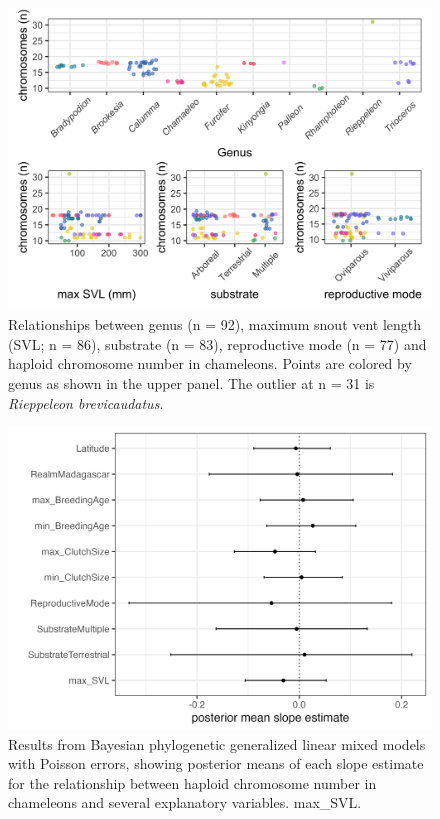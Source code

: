 \documentclass[a4paper, 12pt]{article}
\begin{document}
\begin{figure}[H]
 \centering
  \includegraphics[width = \linewidth]{figures/ecology-genus-svl.png}
  \caption{Relationships between genus (n = 92), maximum snout vent length (SVL; n = 86), substrate (n = 83), reproductive mode (n = 77) and haploid chromosome number in chameleons. Points are colored by genus as shown in the upper panel. The outlier at n = 31 is \textit{Rieppeleon brevicaudatus}.
}
  \label{fig-ecology1}
\end{figure} 

\newpage
\begin{figure}[H]
 \centering
  \includegraphics[width = \linewidth]{figures/mcmcglmm-figure.png}
  \caption{Results from Bayesian phylogenetic generalized linear mixed models with Poisson errors, showing posterior means of each slope estimate for the relationship between haploid chromosome number in chameleons and several explanatory variables. max\_SVL.
}
  \label{fig-ecology2}
\end{figure}
\end{document}
